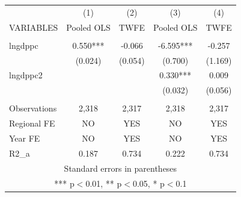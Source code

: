 \documentclass[]{article}
\begin{document}
\begin{tabular}{lcccc} \hline
 & (1) & (2) & (3) & (4) \\
VARIABLES & Pooled OLS & TWFE & Pooled OLS & TWFE \\ \hline
 &  &  &  &  \\
lngdppc & 0.550*** & -0.066 & -6.595*** & -0.257 \\
 & (0.024) & (0.054) & (0.700) & (1.169) \\
lngdppc2 &  &  & 0.330*** & 0.009 \\
 &  &  & (0.032) & (0.056) \\
 &  &  &  &  \\
Observations & 2,318 & 2,317 & 2,318 & 2,317 \\
Regional FE & NO & YES & NO & YES \\
Year FE & NO & YES & NO & YES \\
 R2\_a & 0.187 & 0.734 & 0.222 & 0.734 \\ \hline
\multicolumn{5}{c}{ Standard errors in parentheses} \\
\multicolumn{5}{c}{ *** p$<$0.01, ** p$<$0.05, * p$<$0.1} \\
\end{tabular}
\end{document}
